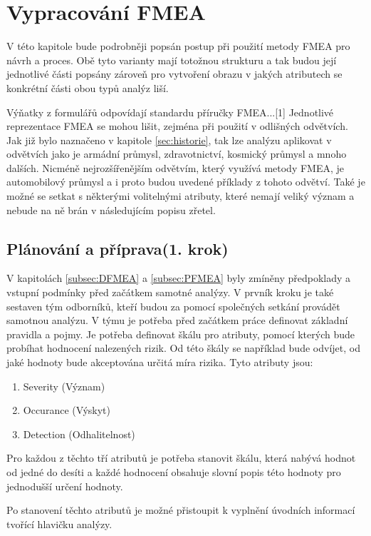 \chapter{Vypracování FMEA }
\label{sec:FMEA_postup}
V této kapitole bude podrobněji popsán postup při použití metody FMEA pro návrh a proces. Obě tyto varianty mají totožnou strukturu a tak budou její jednotlivé části popsány zároveň pro vytvoření obrazu v jakých atributech se konkrétní části obou typů analýz liší. 

Výňatky z formulářů odpovídají standardu příručky FMEA...[1] Jednotlivé reprezentace FMEA se mohou lišit, zejména při použití v odlišných odvětvích. Jak již bylo naznačeno v kapitole \ref{sec:historie}, tak lze analýzu aplikovat v odvětvích jako je armádní průmysl, zdravotnictví, kosmický průmysl a mnoho dalších. Nicméně nejrozšířenějším odvětvím, který využívá metody FMEA, je automobilový průmysl a i proto budou uvedené příklady z tohoto odvětví. Také je možné se setkat s některými volitelnými atributy, které nemají veliký význam a nebude na ně brán v následujícím popisu zřetel.  

\section{Plánování a příprava(1. krok)}
V kapitolách \ref{subsec:DFMEA} a \ref{subsec:PFMEA}  byly zmíněny předpoklady a vstupní podmínky před začátkem samotné analýzy. V prvník kroku je také sestaven tým odborníků, kteří budou za pomocí společných setkání provádět samotnou analýzu. V týmu je potřeba před začátkem práce definovat základní pravidla a pojmy. Je potřeba definovat škálu pro atributy, pomocí kterých bude probíhat hodnocení nalezených rizik. Od této škály se například bude odvíjet, od jaké hodnoty bude akceptována určitá míra rizika. Tyto atributy jsou: 

\begin{enumerate}
	\item Severity (Význam)
	\item Occurance (Výskyt)
	\item Detection (Odhalitelnost)
\end{enumerate}

Pro každou z těchto tří atributů je potřeba stanovit škálu, která nabývá hodnot od jedné do desíti a každé hodnocení obsahuje slovní popis této hodnoty pro jednodušší určení hodnoty. 

Po stanovení těchto atributů je možné přistoupit k vyplnění úvodních informací tvořící hlavičku analýzy. 

